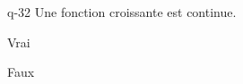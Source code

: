 \begin{truefalse}{q-32}
Une fonction croissante est continue.
\item Vrai
\item* Faux
\end{truefalse}

